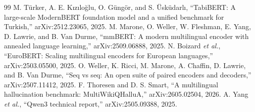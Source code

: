 \documentclass[conference,a4paper]{IEEEtran}
\begin{document}
\begin{thebibliography}{99}
 M. Türker, A. E. Kızıloğlu, O. Güngör, and S. Üsküdarlı, ``TabiBERT: A large-scale ModernBERT foundation model and a unified benchmark for Turkish,'' arXiv:2512.23065, 2025.
 M. Marone, O. Weller, W. Fleshman, E. Yang, D. Lawrie, and B. Van Durme, ``mmBERT: A modern multilingual encoder with annealed language learning,'' arXiv:2509.06888, 2025.
 N. Boizard \emph{et al.}, ``EuroBERT: Scaling multilingual encoders for European languages,'' arXiv:2503.05500, 2025.
 O. Weller, K. Ricci, M. Marone, A. Chaffin, D. Lawrie, and B. Van Durme, ``Seq vs seq: An open suite of paired encoders and decoders,'' arXiv:2507.11412, 2025.
 F. Thoresen and D. S. Smart, ``A multilingual hallucination benchmark: MultiWikiQHalluA,'' arXiv:2605.02504, 2026.
 A. Yang \emph{et al.}, ``Qwen3 technical report,'' arXiv:2505.09388, 2025.
\end{thebibliography}
\end{document}
